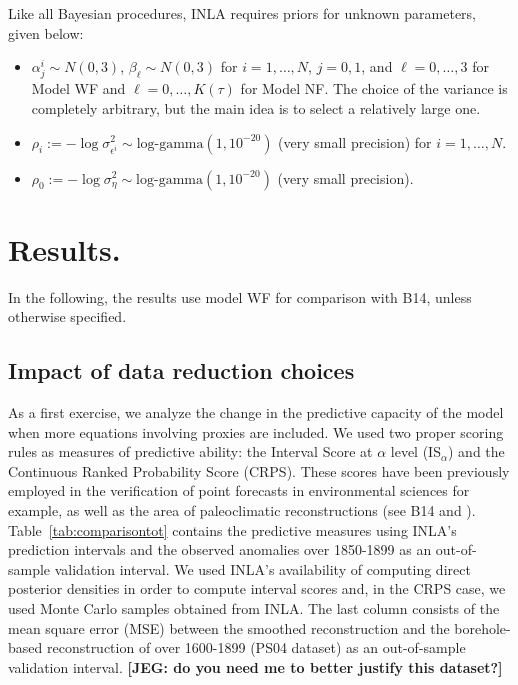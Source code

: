 \documentclass[12pt]{amsart}
\theoremstyle{plain}
\theoremstyle{definition}
\theoremstyle{remark}
\newcommand{\lb}[1]{\color{MidnightBlue}\textbf{[LB: #1]}\normalcolor}
\newcommand{\jeg}[1]{\color{ProcessBlue}\textbf{[JEG: #1]}\normalcolor}
\begin{document}
Like all Bayesian procedures, INLA requires priors for unknown parameters, given below:
\begin{itemize}
\item $\alpha^i_j\sim N(0,3)$, $\beta_\ell \sim N(0,3)$ for $i=1,\ldots,N$, $j=0,1$, and  $\ell=0,\ldots,3$
  for Model WF and $\ell=0,\ldots,K(\tau)$ for Model NF. The choice of the variance is
  completely arbitrary, but the main idea is to select a relatively large one.
  
\item $\rho_i := -\log \sigma^2_{\epsilon^i}\sim \text{log-gamma}(1,10^{-20})$
  (very small precision) for $i=1,\ldots,N$.
  
\item $\rho_0 := -\log \sigma^2_\eta \sim \text{log-gamma}(1,10^{-20})$ (very
  small precision).
\end{itemize}


\section{Results.}
\label{sec:results}

In the following, the results use model WF for comparison with B14, unless otherwise specified.


\subsection{Impact of data reduction choices}
As a first exercise, we analyze the change in the predictive capacity of the
 model when more equations involving proxies are included. We used
two proper scoring rules \cite{Gneiting2007a} as measures of predictive ability: the Interval Score at $\alpha$ level
(IS$_\alpha$) and the Continuous Ranked
Probability Score (CRPS). These scores have been previously employed in the
verification of point forecasts in environmental sciences for example, as well as the area
of paleoclimatic reconstructions (see B14 and
\cite{Scheuerer2014}). Table~\ref{tab:comparisontot} contains the predictive
measures using INLA's prediction intervals and the observed
  anomalies over 1850-1899 as an out-of-sample validation interval. We used INLA's availability of computing direct
posterior densities in order to compute interval scores and, in the CRPS case,
we used Monte Carlo samples obtained from INLA.  The
  last column consists of the mean square error (MSE) between the smoothed
  reconstruction and the borehole-based
reconstruction of \cite{Pollack2004} over 1600-1899 (PS04 dataset) as an out-of-sample
validation interval. \jeg{do you need me to better justify this dataset?}
\end{document}
